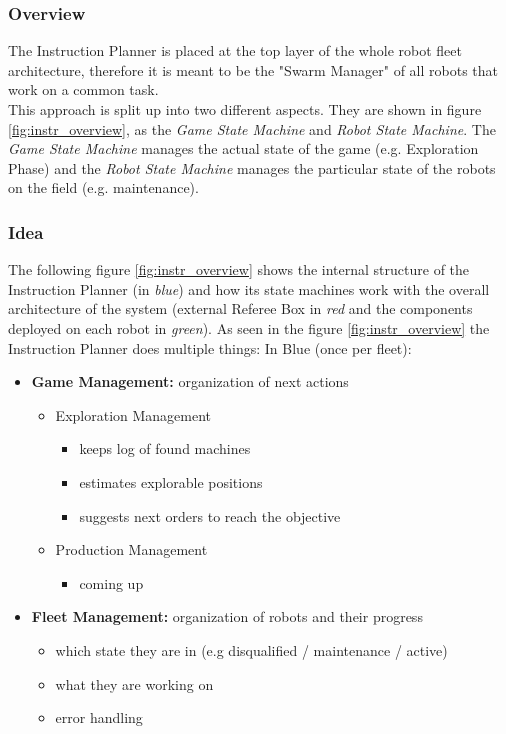 

\subsubsection{Overview}
The Instruction Planner is placed at the top layer of the whole robot fleet architecture,
therefore it is meant to be the "Swarm Manager" of all robots that work on a common task. \\
This approach is split up into two different aspects. They are shown in figure \ref{fig:instr_overview}, as the \textit{Game State Machine} and \textit{Robot State Machine}.
The \textit{Game State Machine} manages the actual state of the game (e.g. Exploration Phase) and the \textit{Robot State Machine} manages the particular state of the robots on the field (e.g. maintenance).

\subsubsection{Idea}

The following figure \ref{fig:instr_overview} shows the internal structure of the
Instruction Planner (in \textit{blue})  and how its state machines work with the overall architecture of the system (external Referee Box in \textit{red} and the components deployed on each robot in \textit{green}).
As seen in the figure \ref{fig:instr_overview} the Instruction Planner does multiple things: \newpage
In Blue (once per fleet):\\
\begin{itemize}
    \item \textbf{Game Management:}  organization of next actions
    \begin{itemize}
        \item Exploration Management
            \begin{itemize}
                \item keeps log of found machines
                \item estimates explorable positions
                \item suggests next orders to reach the objective
            \end{itemize}
        \item Production Management
        \begin{itemize}
            \item coming up
        \end{itemize}
    \end{itemize}
    \item \textbf{Fleet Management:} organization of robots and their progress
    \begin{itemize}
        \item which state they are in (e.g disqualified / maintenance / active)
        \item what they are working on
        \item error handling
    \end{itemize}
\end{itemize}

